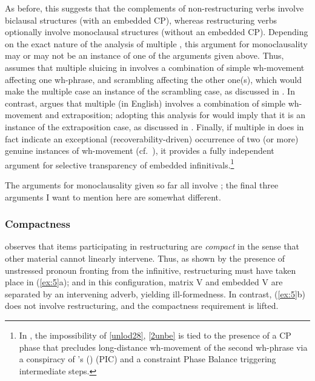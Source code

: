 \documentclass[output=paper]{langsci/langscibook}
\newcommand{\scite}[2]{\citeauthor{#2}#1 (\citeyear{#2})}
\begin{document}
\largerpage[-1]
As before, this suggests that the complements of non-restructuring verbs
involve biclausal structures (with an embedded CP), whereas  restructuring
verbs optionally involve monoclausal structures (without an embedded CP).
Depending on the exact nature of the analysis of multiple , this
argument for monoclausality may or may not be an instance of one of the
arguments given above. Thus, \cite{Sauerland:99:loc} assumes that multiple
sluicing in  involves a combination of simple wh-movement affecting one
wh-phrase, and scrambling affecting the other one(s), which would make the
multiple  case an instance of the scrambling case, as discussed in
. In contrast, \cite{Lasnik:14:mul} argues that multiple  (in
English) involves a combination of simple wh-movement and extraposition;
adopting this analysis for  would imply that it is an instance of the
extraposition case, as discussed in .  Finally, if multiple 
in  does in fact indicate an exceptional (recoverability-driven)
occurrence of two (or more) genuine instances of wh-movement (cf.\
\citealt{Merchant2001,Heck&Mueller:03:vers}), it provides a fully
independent argument for selective transparency of embedded
infinitivals.\footnote{In \cite{Heck&Mueller:03:vers}, the impossibility of
    \eqref{unlod28}, \eqref{2unbe} is tied to the presence of a CP phase that
    precludes long-distance wh-movement of the second wh-phrase via a
    conspiracy of \scite{'s}{Chomsky2001} 
(\glsunset{PIC}\gls{PIC}) and a constraint Phase Balance triggering
intermediate \isi{movement} steps.}

The arguments for monoclausality given so far all involve ; the final
three arguments I want to mention here are somewhat different.

\subsubsection{\label{m5}Compactness}

\cite{Haider:10} observes that items participating in restructuring are {\itshape compact} in the sense
that other material cannot linearly intervene. Thus, as shown by the
presence of unstressed pronoun fronting\is{fronting!of pronouns} from the infinitive,
restructuring must have taken place in (\ref{ex:5}a); and in this
configuration, matrix V and embedded V are separated by an intervening adverb,
yielding ill-formedness. In contrast, (\ref{ex:5}b) does not involve
restructuring, and the compactness requirement is lifted.
\end{document}
